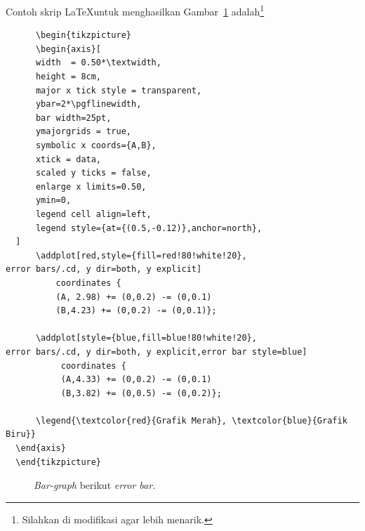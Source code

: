 Contoh skrip \LaTeX untuk menghasilkan Gambar~\ref{Fig:bargraph-error}
adalah\footnote{Silahkan di modifikasi agar lebih menarik.}
\begin{verbatim}
      \begin{tikzpicture}
      \begin{axis}[
      width  = 0.50*\textwidth,
      height = 8cm,
      major x tick style = transparent,
      ybar=2*\pgflinewidth,
      bar width=25pt,
      ymajorgrids = true,
      symbolic x coords={A,B},
      xtick = data,
      scaled y ticks = false,
      enlarge x limits=0.50,
      ymin=0,
      legend cell align=left,
      legend style={at={(0.5,-0.12)},anchor=north},
  ]
      \addplot[red,style={fill=red!80!white!20},
error bars/.cd, y dir=both, y explicit]
          coordinates {
          (A, 2.98) += (0,0.2) -= (0,0.1)
          (B,4.23) += (0,0.2) -= (0,0.1)};

      \addplot[style={blue,fill=blue!80!white!20},
error bars/.cd, y dir=both, y explicit,error bar style=blue]
           coordinates {
           (A,4.33) += (0,0.2) -= (0,0.1)
           (B,3.82) += (0,0.5) -= (0,0.2)};

      \legend{\textcolor{red}{Grafik Merah}, \textcolor{blue}{Grafik Biru}}
  \end{axis}
  \end{tikzpicture}
\end{verbatim}
\begin{figure}[htbp]
  
  \caption{\textit{Bar-graph} berikut \textit{error bar}.}
  \label{Fig:bargraph-error}
\end{figure}

